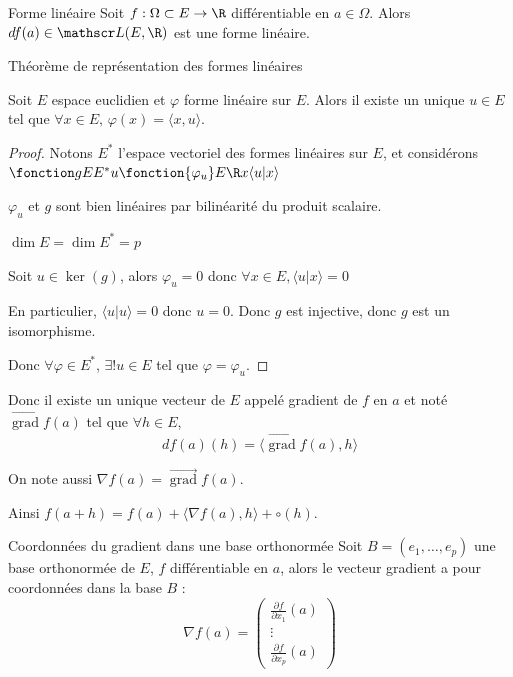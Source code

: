 \begin{definition}{Forme linéaire}{}
    Soit $f : \Omega \subset E \to \R$ différentiable en $a \in \Omega$. 
    Alors $df(a) \in \mathscr L(E, \R)$ est une forme linéaire. 
\end{definition}

 Théorème de représentation des formes linéaires

\avspace Soit $E$ espace euclidien et $\varphi$ forme linéaire sur $E$. 
Alors il existe un unique $u \in E$ tel que $\forall x \in E, \, \varphi(x) = \langle x, u \rangle$.


\begin{proof}
    Notons $E^*$ l'espace vectoriel des formes linéaires sur $E$, et considérons 
    $\fonction g E {E^*}{u}{\fonction{\varphi_u} E \R x {\langle u | x \rangle}}$

    $\varphi_u$ et $g$ sont bien linéaires par bilinéarité du produit scalaire.

    $\dim E= \dim E^* = p$

    Soit $u \in \ker(g)$, alors $\varphi_u = 0$ donc $\forall x \in E, \langle u | x \rangle = 0$

    En particulier, $\langle u | u \rangle = 0$ donc $u = 0$. Donc $g$ est injective, donc $g$ est un isomorphisme.

    Donc $\forall \varphi \in E^*$, $\exists ! u \in E$ tel que $\varphi = \varphi_u$. 
\end{proof}



Donc il existe un unique vecteur de $E$ appelé gradient de $f$ en $a$ et noté 
$\overrightarrow{\operatorname{grad}} f(a)$ tel que $\forall h \in E$, 
$$df(a)(h) = \langle \overrightarrow{\operatorname{grad}} f(a) , h \rangle$$
 
On note aussi $\nabla f(a) = \overrightarrow{\operatorname{grad}} f(a)$.

Ainsi $f(a + h) = f(a) + \langle \nabla f(a), h \rangle + \circ(h)$.

\begin{proposition}{Coordonnées du gradient dans une base orthonormée}{}
    Soit $B = (e_1, \ldots, e_p)$ une base orthonormée de $E$, $f$ différentiable en $a$, alors 
    le vecteur gradient a pour coordonnées dans la base $B$ :
    $$\nabla f(a) = \begin{pmatrix}
        \frac{\partial f}{\partial x_1} (a) \\
        \vdots \\
        \frac{\partial f}{\partial x_p} (a)
    \end{pmatrix}$$
\end{proposition}

